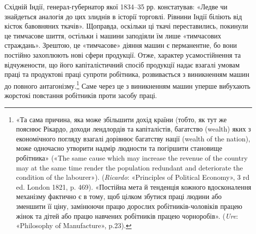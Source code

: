 Східній Індії, генерал-губернатор якої 1834--35 рр. констатував:
«Ледве чи знайдеться аналогія до цих злиднів в історії
торговлі. Рівнини Індії біліють від кісток бавовняних ткачів».
Щоправда, оскільки ці ткачі переставились, покинули це тимчасове
шиття, остільки і машини заподіяли їм лише «тимчасових
страждань». Зрештою, це «тимчасове» діяння машин є перманентне,
бо вони постійно захоплюють нові сфери продукції. Отже,
характер усамостійнення та відчужености, що його капіталістичний
спосіб продукції надає взагалі умовам праці та продуктові
праці супроти робітника, розвивається з виникненням
машин до повного антагонізму.\footnote{
«Та сама причина, яка може збільшити дохід країни (тобто, як
тут же пояснює Рікардо, доходи лендлордів та капіталістів, багатство
(wealth) яких з економічного погляду взагалі дорівнює багатству нації
(wealth of the nation), може одночасно утворити надмір людности та
погіршити становище робітника» («The same cause which may increase
the revenue of the country may at the same time render the population
redundant and deteriorate the condition of the labourer»). (\emph{Ricardo}:
«Principles of Political Economy», 3 rd ed. London 1821, p. 469). «Постійна
мета й тенденція кожного вдосконалення механізму фактично є в тому,
щоб цілком збутися праці людини або зменшити її ціну, замінюючи працю
дорослих робітників-чоловіків працею жінок та дітей або працю навчених
робітників працею чорноробів». (\emph{Ure}: «Philosophy of Manufacture», p.23).
} Саме через це з виникненням машин уперше вибухають жорстокі повстання
робітників проти засобу праці.

